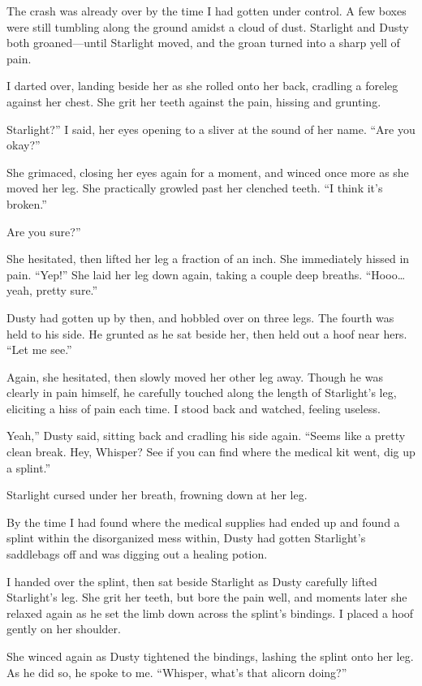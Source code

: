 The crash was already over by the time I had gotten under control. A few boxes were still tumbling along the ground amidst a cloud of dust. Starlight and Dusty both groaned—until Starlight moved, and the groan turned into a sharp yell of pain.

I darted over, landing beside her as she rolled onto her back, cradling a foreleg against her chest. She grit her teeth against the pain, hissing and grunting.

\leavevmode{}Starlight?” I said, her eyes opening to a sliver at the sound of her name. “Are you okay?”

She grimaced, closing her eyes again for a moment, and winced once more as she moved her leg. She practically growled past her clenched teeth. “I think it’s broken.”

\leavevmode{}Are you sure?”

She hesitated, then lifted her leg a fraction of an inch. She immediately hissed in pain. “Yep!” She laid her leg down again, taking a couple deep breaths. “Hooo… yeah, pretty sure.”

Dusty had gotten up by then, and hobbled over on three legs. The fourth was held to his side. He grunted as he sat beside her, then held out a hoof near hers. “Let me see.”

Again, she hesitated, then slowly moved her other leg away. Though he was clearly in pain himself, he carefully touched along the length of Starlight’s leg, eliciting a hiss of pain each time. I stood back and watched, feeling useless.

\leavevmode{}Yeah,” Dusty said, sitting back and cradling his side again. “Seems like a pretty clean break. Hey, Whisper? See if you can find where the medical kit went, dig up a splint.”

Starlight cursed under her breath, frowning down at her leg.

By the time I had found where the medical supplies had ended up and found a splint within the disorganized mess within, Dusty had gotten Starlight’s saddlebags off and was digging out a healing potion.

I handed over the splint, then sat beside Starlight as Dusty carefully lifted Starlight’s leg. She grit her teeth, but bore the pain well, and moments later she relaxed again as he set the limb down across the splint’s bindings. I placed a hoof gently on her shoulder.

She winced again as Dusty tightened the bindings, lashing the splint onto her leg. As he did so, he spoke to me. “Whisper, what’s that alicorn doing?”

